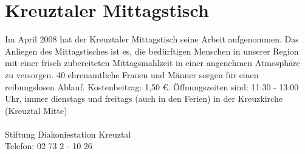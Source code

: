 \section{Kreuztaler Mittagstisch}
Im April 2008 hat der Kreuztaler Mittagstisch seine Arbeit aufgenommen. Das Anliegen des Mittagstisches ist es, die bedürftigen Menschen in unserer Region mit einer frisch zubereiteten Mittagsmahlzeit in einer angenehmen Atmosphäre zu versorgen. 40 ehrenamtliche Frauen und Männer sorgen für einen reibungslosen Ablauf. Kostenbeitrag: 1,50 \euro. Öffnungszeiten sind: 11:30 - 13:00 Uhr, immer dienstags und freitags (auch in den Ferien) in der Kreuzkirche (Kreuztal Mitte)  \\
\\
Stiftung Diakoniestation Kreuztal\\
Telefon: 02 73 2 - 10 26 
